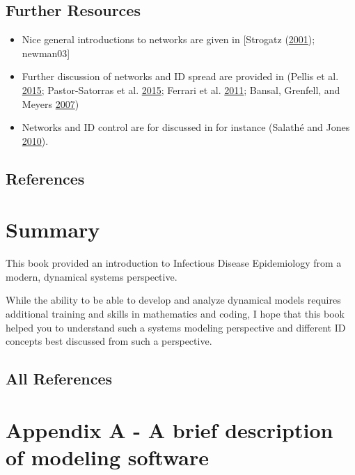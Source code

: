\documentclass[]{book}
\providecommand{\tightlist}{%
  \setlength{\itemsep}{0pt}\setlength{\parskip}{0pt}}
\theoremstyle{definition}
\theoremstyle{definition}
\theoremstyle{definition}
\theoremstyle{remark}
\begin{document}
\section{Further Resources}\label{further-resources-15}

\begin{itemize}
\tightlist
\item
  Nice general introductions to networks are given in {[}Strogatz
  (\protect\hyperlink{ref-strogatz01}{2001}); newman03{]}
\item
  Further discussion of networks and ID spread are provided in (Pellis
  et al. \protect\hyperlink{ref-pellis15}{2015}; Pastor-Satorras et al.
  \protect\hyperlink{ref-pastor-satorras15}{2015}; Ferrari et al.
  \protect\hyperlink{ref-ferrari11}{2011}; Bansal, Grenfell, and Meyers
  \protect\hyperlink{ref-bansal07}{2007})
\item
  Networks and ID control are for discussed in for instance (Salathé and
  Jones \protect\hyperlink{ref-salathe10}{2010}).
\end{itemize}

\section{References}\label{references-16}

\chapter{Summary}\label{summary}

This book provided an introduction to Infectious Disease Epidemiology
from a modern, dynamical systems perspective.

While the ability to be able to develop and analyze dynamical models
requires additional training and skills in mathematics and coding, I
hope that this book helped you to understand such a systems modeling
perspective and different ID concepts best discussed from such a
perspective.

\section{All References}\label{all-references}

\chapter{Appendix A - A brief description of modeling
software}\label{appendix-a---a-brief-description-of-modeling-software}
\end{document}
